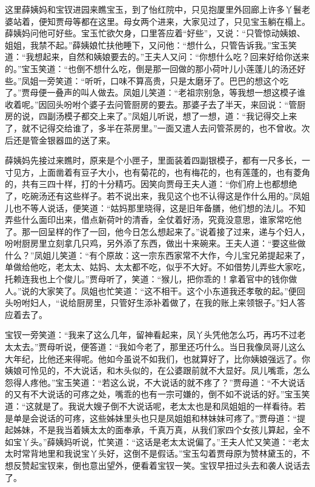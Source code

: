 这里薛姨妈和宝钗进园来瞧宝玉，到了怡红院中，只见抱厦里外回廊上许多丫鬟老婆站着，便知贾母等都在这里。母女两个进来，大家见过了，只见宝玉躺在榻上。薛姨妈问他可好些。宝玉忙欲欠身，口里答应着“好些”，又说：“只管惊动姨娘、姐姐，我禁不起。”薛姨娘忙扶他睡下，又问他：“想什么，只管告诉我。”宝玉笑道：“我想起来，自然和姨娘要去的。”王夫人又问：“你想什么吃？回来好给你送来的。”宝玉笑道：“也倒不想什么吃，倒是那一回做的那小荷叶儿小莲蓬儿的汤还好些。”凤姐一旁笑道：“听听，口味不算高贵，只是太磨牙了。巴巴的想这个吃了。”贾母便一叠声的叫人做去。凤姐儿笑道：“老祖宗别急，等我想一想这模子谁收着呢。”因回头吩咐个婆子去问管厨房的要去。那婆子去了半天，来回说：“管厨房的说，四副汤模子都交上来了。”凤姐儿听说，想了一想，道：“我记得交上来了，就不记得交给谁了，多半在茶房里。”一面又遣人去问管茶房的，也不曾收。次后还是管金银器皿的送了来。

薛姨妈先接过来瞧时，原来是个小匣子，里面装着四副银模子，都有一尺多长，一寸见方，上面凿着有豆子大小，也有菊花的，也有梅花的，也有莲蓬的，也有菱角的，共有三四十样，打的十分精巧。因笑向贾母王夫人道：“你们府上也都想绝了，吃碗汤还有这些样子。若不说出来，我见这个也不认得这是作什么用的。”凤姐儿也不等人说话，便笑道：“姑妈那里晓得，这是旧年备膳，他们想的法儿。不知弄些什么面印出来，借点新荷叶的清香，全仗着好汤，究竟没意思，谁家常吃他了。那一回呈样的作了一回，他今日怎么想起来了。”说着接了过来，递与个妇人，吩咐厨房里立刻拿几只鸡，另外添了东西，做出十来碗来。王夫人道：“要这些做什么？”凤姐儿笑道：“有个原故：这一宗东西家常不大作，今儿宝兄弟提起来了，单做给他吃，老太太、姑妈、太太都不吃，似乎不大好。不如借势儿弄些大家吃，托赖连我也上个俊儿。”贾母听了，笑道：“猴儿，把你乖的！拿着官中的钱你做人。”说的大家笑了。凤姐也忙笑道：“这不相干。这个小东道我还孝敬的起。”便回头吩咐妇人，“说给厨房里，只管好生添补着做了，在我的账上来领银子。”妇人答应着去了。

宝钗一旁笑道：“我来了这么几年，留神看起来，凤丫头凭他怎么巧，再巧不过老太太去。”贾母听说，便答道：“我如今老了，那里还巧什么。当日我像凤哥儿这么大年纪，比他还来得呢。他如今虽说不如我们，也就算好了，比你姨娘强远了。你姨娘可怜见的，不大说话，和木头似的，在公婆跟前就不大显好。凤儿嘴乖，怎么怨得人疼他。”宝玉笑道：“若这么说，不大说话的就不疼了？”贾母道：“不大说话的又有不大说话的可疼之处，嘴乖的也有一宗可嫌的，倒不如不说话的好。”宝玉笑道：“这就是了。我说大嫂子倒不大说话呢，老太太也是和凤姐姐的一样看待。若是单是会说话的可疼，这些姊妹里头也只是凤姐姐和林妹妹可疼了。”贾母道：“提起姊妹，不是我当着姨太太的面奉承，千真万真，从我们家四个女孩儿算起，全不如宝丫头。”薛姨妈听说，忙笑道：“这话是老太太说偏了。”王夫人忙又笑道：“老太太时常背地里和我说宝丫头好，这倒不是假话。”宝玉勾着贾母原为赞林黛玉的，不想反赞起宝钗来，倒也意出望外，便看着宝钗一笑。宝钗早扭过头去和袭人说话去了。

